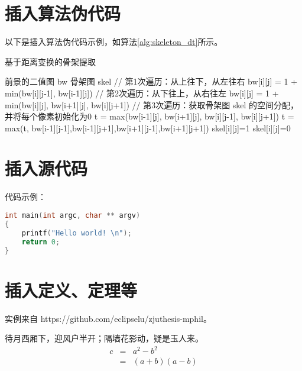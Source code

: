 



\section{插入算法伪代码}
以下是插入算法伪代码示例，如算法\ref{alg:skeleton_dt}所示。

\begin{algorithm}[!htb]
\caption{基于距离变换的骨架提取}
\label{alg:skeleton_dt}
\begin{algorithmic}[1]
\Require 前景的二值图 bw  
\Ensure 骨架图 skel
\State // 第1次遍历：从上往下，从左往右
 
     
        \State bw[i][j] = 1 + min(bw[i][j-1], bw[i-1][j])   
    \EndFor
\EndFor
\State // 第2次遍历：从下往上，从右往左
        \State bw[i][j] = 1 + min(bw[i][j], bw[i+1][j], bw[i][j+1])
    \EndFor
\EndFor
\State // 第3次遍历：获取骨架图
\State skel 的空间分配，并将每个像素初始化为0
        \State t = max(bw[i-1][j], bw[i+1][j], bw[i][j-1], bw[i][j+1])   
        \State t = max(t, bw[i-1][j-1],bw[i-1][j+1],bw[i+1][j-1],bw[i+1][j+1])
        	\State skel[i][j]=1  
        \Else 
        	\State skel[i][j]=0
        \EndIf
    \EndFor
\EndFor
\end{algorithmic}
\end{algorithm}

\section{插入源代码}
代码示例：

\begin{lstlisting}[language=C] 
int main(int argc, char ** argv) 
{ 
	printf("Hello world! \n"); 
	return 0; 
} 
\end{lstlisting} 

\section{插入定义、定理等}
实例来自 https://github.com/eclipselu/zjuthesis-mphil。

\begin{hypo}
待月西厢下，迎风户半开；隔墙花影动，疑是玉人来。
\begin{eqnarray}
  \label{eq:eqnxmp}
  c & = & a^2 - b^2\\
    & = & (a+b)(a-b)
\end{eqnarray}
\end{hypo}

